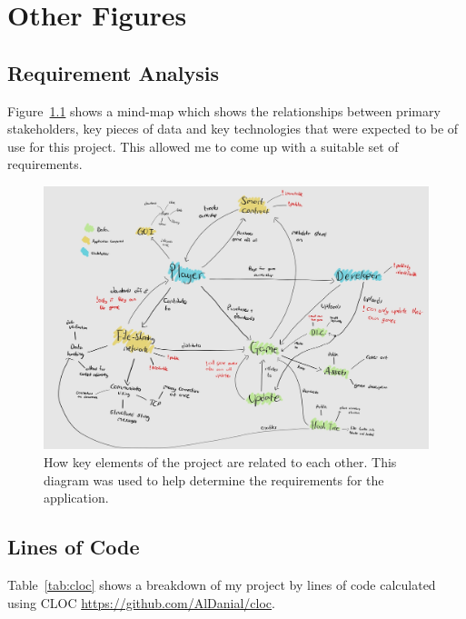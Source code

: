 \appendix




\chapter{Other Figures}

\section*{Requirement Analysis}\label{app:req-analysis}

Figure~\ref{fig:req-generator} shows a mind-map which shows the relationships between primary stakeholders, key pieces of data and key technologies that were expected to be of use for this project. This allowed me to come up with a suitable set of requirements.

\begin{figure}[ht]
  \centering
  \includegraphics[width=.9\textwidth]{assets/images/diagrams/requirement-generation.jpg}
  \caption{How key elements of the project are related to each other. This diagram was used to help determine the requirements for the application.}
  \label{fig:req-generator}
\end{figure}

\section*{Lines of Code}

Table~\ref{tab:cloc} shows a breakdown of my project by lines of code calculated using CLOC \url{https://github.com/AlDanial/cloc}. 

